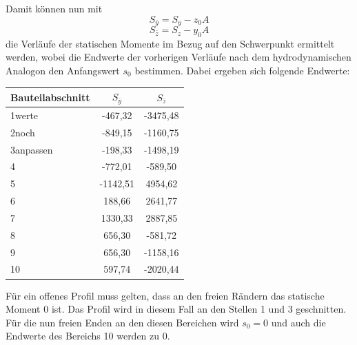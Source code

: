 Damit können nun mit
\begin{equation}
	S_{\bar{y}}=S_y-z_0A
\end{equation} 
\begin{equation}
S_{\bar{z}}=S_z-y_0A
\end{equation} 
die Verläufe der statischen Momente im Bezug auf den Schwerpunkt ermittelt werden, wobei die Endwerte der vorherigen Verläufe nach dem hydrodynamischen Analogon den Anfangswert $s_0$ bestimmen. Dabei ergeben sich folgende Endwerte:
\begin{center}
\begin{tabular}[h]{l|c|c}
Bauteilabschnitt&$S_{\bar{y}}$&$S_{\bar{z}}$\\
\hline
1werte&-467,32&-3475,48\\
2noch&-849,15&-1160,75\\
3anpassen&-198,33&-1498,19\\
4&-772,01&-589,50\\
5&-1142,51&4954,62\\
6&188,66&2641,77\\
7&1330,33&2887,85\\
8&656,30&-581,72\\
9&656,30&-1158,16\\
10&597,74&-2020,44\\
\end{tabular}
\end{center}
Für ein offenes Profil muss gelten, dass an den freien Rändern das statische Moment $ 0 $ ist. Das Profil wird in diesem Fall an den Stellen 1 und 3 geschnitten. Für die nun freien Enden an den diesen Bereichen wird $s_0=0$ und auch die Endwerte des Bereichs 10 werden zu $0$.

